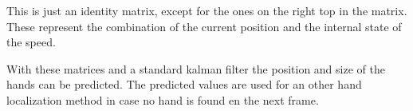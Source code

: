 This is just an identity matrix, except for the ones on the right top in the matrix. These represent the combination of the current position and the internal state of the speed.

With these matrices and a standard kalman filter the position and size of the hands can be predicted. The predicted values are used for an other hand localization method in case no hand is found en the next frame.




% 









